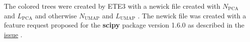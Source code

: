 The colored trees were created by ETE3 with a newick file created with $N_{\text{PCA}}$ and $L_{\text{PCA}}$ and otherwise $N_{\text{UMAP}}$ and $L_{\text{UMAP}}$ \autocite{huerta-cepas_ete_2016}. The newick file was created with a feature request proposed for the \textbf{scipy} package version 1.6.0 as described in the \href{https://github.com/scipy/scipy/issues/8274}{issue} \autocite{scipy_10_contributors_scipy_2020}.

